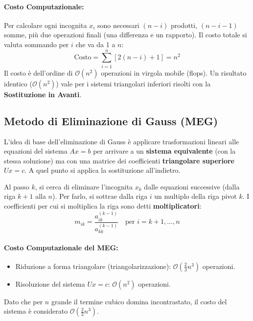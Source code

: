 \documentclass[a4paper,12pt]{article}
\begin{document}
	\paragraph{Costo Computazionale:}
	Per calcolare ogni incognita $x_i$ sono necessari $(n-i)$ prodotti, $(n-i-1)$ somme, più due operazioni finali (una differenza e un rapporto). Il costo totale si valuta sommando per $i$ che va da 1 a $n$:
	\begin{equation}
		\text{Costo} = \sum_{i=1}^{n} [2(n-i) + 1] = n^2
	\end{equation}
	Il costo è dell'ordine di $\mathcal{O}(n^2)$ operazioni in virgola mobile (flops). Un risultato identico ($\mathcal{O}(n^2)$) vale per i sistemi triangolari inferiori risolti con la \textbf{Sostituzione in Avanti}.
	
	\subsection{Metodo di Eliminazione di Gauss (MEG)}
	L'idea di base dell'eliminazione di Gauss è applicare trasformazioni lineari alle equazioni del sistema $Ax = b$ per arrivare a un \textbf{sistema equivalente} (con la stessa soluzione) ma con una matrice dei coefficienti \textbf{triangolare superiore} $Ux=c$. A quel punto si applica la sostituzione all'indietro.
	
	Al passo $k$, si cerca di eliminare l'incognita $x_k$ dalle equazioni successive (dalla riga $k+1$ alla $n$). Per farlo, si sottrae dalla riga $i$ un multiplo della riga pivot $k$. 
	I coefficienti per cui si moltiplica la riga sono detti \textbf{moltiplicatori}:
	\begin{equation}
		m_{ik} = \frac{a_{ik}^{(k-1)}}{a_{kk}^{(k-1)}} \quad \text{per } i = k+1, \dots, n
	\end{equation}
	
	\paragraph{Costo Computazionale del MEG:}
	\begin{itemize}
		\item Riduzione a forma triangolare (triangolarizzazione): $\mathcal{O}(\frac{2}{3}n^3)$ operazioni.
		\item Risoluzione del sistema $Ux=c$: $\mathcal{O}(n^2)$ operazioni.
	\end{itemize}
	Dato che per $n$ grande il termine cubico domina incontrastato, il costo del sistema è considerato $\mathcal{O}(\frac{2}{3}n^3)$.
	
\end{document}
